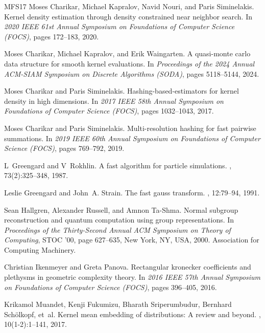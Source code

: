 \documentclass[10pt,a4paper]{article}
\theoremstyle{remark}
\numberwithin{equation}{section}
\numberwithin{theorem}{section}
\begin{document}
\begin{thebibliography}{MFS{\etalchar{+}}17}
Moses Charikar, Michael Kapralov, Navid Nouri, and Paris Siminelakis.
\newblock Kernel density estimation through density constrained near neighbor
  search.
\newblock In {\em 2020 IEEE 61st Annual Symposium on Foundations of Computer
  Science (FOCS)}, pages 172--183, 2020.

Moses Charikar, Michael Kapralov, and Erik Waingarten.
\newblock A quasi-monte carlo data structure for smooth kernel evaluations.
\newblock In {\em Proceedings of the 2024 Annual ACM-SIAM Symposium on Discrete
  Algorithms (SODA)}, pages 5118--5144, 2024.

Moses Charikar and Paris Siminelakis.
\newblock Hashing-based-estimators for kernel density in high dimensions.
\newblock In {\em 2017 IEEE 58th Annual Symposium on Foundations of Computer
  Science (FOCS)}, pages 1032--1043, 2017.

Moses Charikar and Paris Siminelakis.
\newblock Multi-resolution hashing for fast pairwise summations.
\newblock In {\em 2019 IEEE 60th Annual Symposium on Foundations of Computer
  Science (FOCS)}, pages 769--792, 2019.

L~Greengard and V~Rokhlin.
\newblock A fast algorithm for particle simulations.
, 73(2):325--348, 1987.

Leslie Greengard and John~A. Strain.
\newblock The fast gauss transform.
, 12:79--94, 1991.

Sean Hallgren, Alexander Russell, and Amnon Ta-Shma.
\newblock Normal subgroup reconstruction and quantum computation using group
  representations.
\newblock In {\em Proceedings of the Thirty-Second Annual ACM Symposium on
  Theory of Computing}, STOC '00, page 627–635, New York, NY, USA, 2000.
  Association for Computing Machinery.

Christian Ikenmeyer and Greta Panova.
\newblock Rectangular kronecker coefficients and plethysms in geometric
  complexity theory.
\newblock In {\em 2016 IEEE 57th Annual Symposium on Foundations of Computer
  Science (FOCS)}, pages 396--405, 2016.

Krikamol Muandet, Kenji Fukumizu, Bharath Sriperumbudur, Bernhard
  Sch{\"o}lkopf, et~al.
\newblock Kernel mean embedding of distributions: A review and beyond.
,
  10(1-2):1--141, 2017.


\end{thebibliography}
\end{document}
